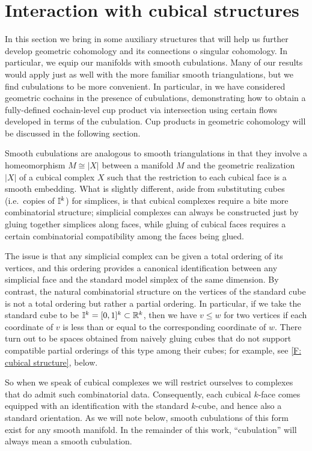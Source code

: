 
\section{Interaction with cubical structures}\label{S: transversality}

In this section we bring in some auxiliary structures that will help us further develop geometric cohomology and its connections o singular cohomology.
In particular, we equip our manifolds with smooth cubulations.
Many of our results would apply just as well with the more familiar smooth triangulations, but we find cubulations to be more convenient.
In particular, in \cite{FMS-flows} we have considered geometric cochains in the presence of cubulations, demonstrating how to obtain a fully-defined cochain-level cup product via intersection using certain flows developed in terms of the cubulation.
Cup products in geometric cohomology will be discussed in the following section.

Smooth cubulations are analogous to smooth triangulations in that they involve a homeomorphism $M \cong |X|$ between a manifold $M$ and the geometric realization $|X|$ of a cubical complex $X$ such that the restriction to each cubical face is a smooth embedding.
What is slightly different, aside from substituting cubes (i.e.\ copies of $\mathbb{I}^k$) for simplices, is that cubical complexes require a bite more combinatorial structure; simplicial complexes can always be constructed just by gluing together simplices along faces, while gluing of cubical faces requires a certain combinatorial compatibility among the faces being glued.

The issue is that any simplicial complex can be given a total ordering of its vertices, and this ordering provides a canonical identification between any simplicial face and the standard model simplex of the same dimension.
By contrast, the natural combinatorial structure on the vertices of the standard cube is not a total ordering but rather a partial ordering.
In particular, if we take the standard cube to be $\mathbb{I}^k = [0,1]^k \subset \mathbb{R}^k$, then we have $v \leq w$ for two vertices if each coordinate of $v$ is less than or equal to the corresponding coordinate of $w$.
There turn out to be spaces obtained from naively gluing cubes that do not support compatible partial orderings of this type among their cubes; for example, see \cref{F: cubical structure}, below.

So when we speak of cubical complexes we will restrict ourselves to complexes that do admit such combinatorial data.
Consequently, each cubical $k$-face comes equipped with an identification with the standard $k$-cube, and hence also a standard orientation.
As we will note below, smooth cubulations of this form exist for any smooth manifold.
In the remainder of this work, ``cubulation'' will always mean a smooth cubulation.

